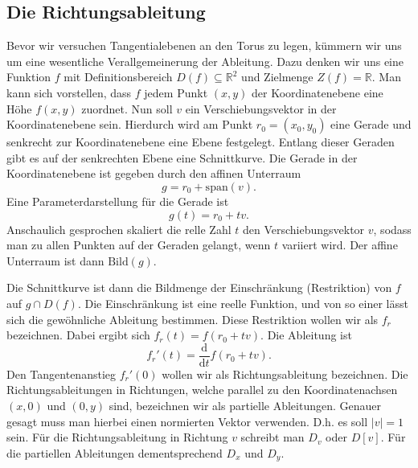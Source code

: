 \documentclass[a4paper,12pt,fleqn]{article}
\begin{document}
\subsection{Die Richtungsableitung}
Bevor wir versuchen Tangentialebenen an den Torus zu legen, kümmern
wir uns um eine wesentliche Verallgemeinerung der Ableitung. Dazu
denken wir uns eine Funktion \(f\) mit Definitionsbereich
\(D(f)\subseteq\mathbb R^2\) und Zielmenge \(Z(f)=\mathbb R\).
Man kann sich vorstellen, dass \(f\) jedem Punkt \((x,y)\) der
Koordinatenebene eine Höhe \(f(x,y)\) zuordnet. Nun soll \(v\) ein
Verschiebungsvektor in der Koordinatenebene sein. Hierdurch
wird am Punkt \(r_0=(x_0,y_0)\) eine Gerade und senkrecht zur
Koordinatenebene eine Ebene festgelegt. Entlang dieser
Geraden gibt es auf der senkrechten Ebene eine Schnittkurve.
Die Gerade in der Koordinatenebene ist gegeben durch
den affinen Unterraum
\begin{equation}
g = r_0+\mathrm{span}(v).
\end{equation}
Eine Parameterdarstellung für die Gerade ist
\begin{equation}
g(t) = r_0+tv.
\end{equation}
Anschaulich gesprochen skaliert die relle Zahl \(t\) den
Verschiebungsvektor \(v\), sodass man zu allen Punkten auf der
Geraden gelangt, wenn \(t\) variiert wird.
Der affine Unterraum ist dann \(\mathrm{Bild}(g)\).

Die Schnittkurve ist dann die Bildmenge der Einschränkung
(Restriktion) von \(f\) auf \(g\cap D(f)\). Die Einschränkung
ist eine reelle Funktion, und von so einer lässt sich die
gewöhnliche Ableitung bestimmen. Diese Restriktion wollen wir
als \(f_r\) bezeichnen. Dabei ergibt sich
\(f_r(t) = f(r_0+tv)\).
Die Ableitung ist
\begin{equation}\label{Restriktion}
f_r'(t) = \frac{\mathrm d}{\mathrm dt} f(r_0+tv).
\end{equation}
Den Tangentenanstieg \(f_r'(0)\) wollen wir als Richtungsableitung
bezeichnen. Die Richtungsableitungen in Richtungen, welche
parallel zu den Koordinatenachsen \((x,0)\) und \((0,y)\) sind,
bezeichnen wir als partielle Ableitungen. Genauer gesagt muss man
hierbei einen normierten Vektor verwenden. D.h. es soll \(|v|=1\) sein.
Für die Richtungsableitung in Richtung \(v\) schreibt man \(D_v\) oder
\(D[v]\). Für die partiellen Ableitungen dementsprechend
\(D_x\) und \(D_y\).
\end{document}
